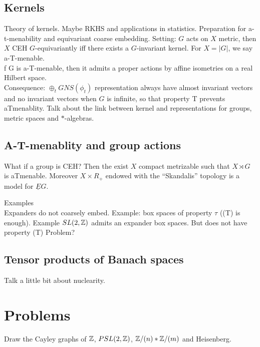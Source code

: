 \subsection{Kernels}

Theory of kernels. Maybe RKHS and applications in statistics. Preparation for a-t-menability and equivariant coarse embedding. Setting: $G$ acts on $X$ metric, then $X$ CEH $G$-equivariantly iff there exists a $G$-invariant kernel. For $X= |G|$, we say a-T-menable. \\

f G is a-T-menable, then it admits a proper actions by affine isometries on a real Hilbert space.\\

Consequence: $\oplus_t GNS(\phi_t)$ representation always have almost invariant vectors and no invariant vectors when $G$ is infinite, so that property T prevents aTmenablity. Talk about the link between kernel and representations for groups, metric spaces and $*$-algebras.\\

\subsection{A-T-menablity and group actions}

What if a group is CEH? Then the exist $X$ compact metrizable such that $X\rtimes G$ is aTmenable. Moreover $X\times R_+$ endowed with the ``Skandalis'' topology is a model for $\underline E G $.

Examples\\

Expanders do not coarsely embed. Example: box spaces of property $\tau$ ((T) is enough). Example $SL(2,\mathbb Z)$ admits an expander box spaces. But does not have property (T) Problem?\\

\subsection{Tensor products of Banach spaces}

Talk a little bit about nuclearity.

\section{Problems}

Draw the Cayley graphs of $\mathbb Z$, $PSL(2,\mathbb Z)$, $\mathbb Z / (n) \ast \mathbb Z / (m)$ and Heisenberg.\\

